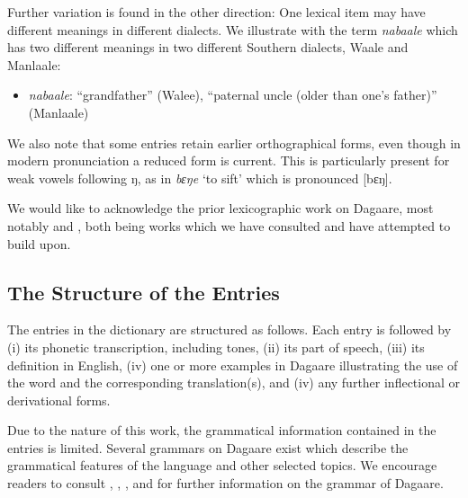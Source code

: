 \begin{refsection}
\noindent Further variation is found in the other direction: One lexical item may have different meanings in different dialects. We illustrate with the term \textit{nabaale} which has two different meanings in two different Southern dialects, Waale and Manlaale:


\begin{itemize}\item \textit{nabaale}: ``grandfather'' (Walee), ``paternal uncle (older than one’s father)''  (Manlaale)
\end{itemize}


We also note that some entries retain earlier orthographical forms, even though in modern pronunciation a reduced form is current.  This is particularly present for weak vowels following ŋ, as in \textit{bɛŋe}  `to sift' which is pronounced [bɛŋ].



We would like to acknowledge the prior lexicographic work on Dagaare, most notably \citet{Durand1953} and \citet{Bodomo2004}, both being works which we have consulted and have attempted to build upon.



\subsection*{The Structure of the Entries}



The entries in the dictionary are structured as follows.  Each entry is followed by (i) its phonetic transcription, including tones, (ii) its part of speech, (iii) its definition in English, (iv) one or more examples in Dagaare illustrating the use of the word and the corresponding translation(s), and (iv) any further inflectional or derivational forms.  

Due to the nature of this work, the grammatical information contained in the entries is limited.  %
Several grammars on Dagaare exist which describe the grammatical features of the language and other selected topics.  We encourage readers to consult \citet{Bodomo1997},  \citet{Bodomo2000}, \citet{Bodomo2004}, and \citet{Dakubu2005} for further information on the grammar of Dagaare.


\end{refsection}
